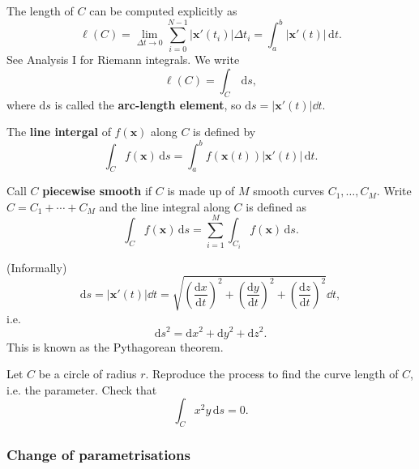 \begin{definition}
    The length of $C$ can be computed explicitly as 
    \[
        \ell (C) = \lim_{\Delta t \to 0} \sum_{i=0}^{N-1} \left| \mathbf{x}'(t_i) \right| \Delta t_i = \int_{a}^{b} \left| \mathbf{x}'(t) \right|  \,\mathrm{d}t.
    \]
    See Analysis I for Riemann integrals. We write 
    \[
        \ell (C) = \int_{C} \,\mathrm{d}s,
    \]
    where $ \mathrm{d} s $ is called the \textbf{arc-length element}, so $ \mathrm{d} s = |\mathbf{x}'(t)| \dd t $.
\end{definition}
\begin{definition}
    The \textbf{line intergal} of $f(\mathbf{x})$ along $C$ is defined by 
    \[
        \int_{C} f(\mathbf{x}) \,\mathrm{d}s = \int_{a}^{b} f(\mathbf{x}(t)) \left| \mathbf{x}'(t) \right| \,\mathrm{d}t.
    \]
\end{definition}
\begin{definition}
    Call $C$ \textbf{piecewise smooth} if $C$ is made up of $M$ smooth curves $ C_1,\dots,C_M $. Write $C=C_1+\cdots+C_M$ and the line integral along $C$ is defined as 
    \[
        \int_{C} f(\mathbf{x}) \,\mathrm{d}s = \sum_{i=1}^{M}\int_{C_i} f(\mathbf{x}) \,\mathrm{d}s.
    \]
\end{definition}
\begin{note}
    (Informally) 
    \[
        \mathrm{d} s = |\mathbf{x}'(t)|\dd t = \sqrt{\left( \frac{\mathrm{d}x}{\mathrm{d}t}  \right)^2+\left(\frac{\mathrm{d}y}{\mathrm{d}t}  \right)^2+\left(\frac{\mathrm{d}z}{\mathrm{d}t}  \right)^2}\dd t,
    \]
    i.e.
    \[
        \mathrm{d} s^2 = \mathrm{d} x^2+\mathrm{d} y^2+\mathrm{d} z^2.
    \]
    This is known as the Pythagorean theorem.
\end{note}
\begin{example}
    Let $C$ be a circle of radius $r$. Reproduce the process to find the curve length of $C$, i.e. the parameter. Check that 
    \[
        \int_{C} x^2y \,\mathrm{d}s = 0.
    \]
\end{example}

\subsubsection*{Change of parametrisations}

